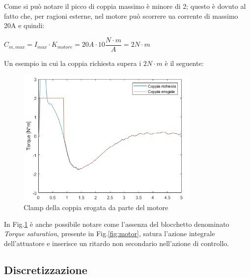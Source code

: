 Come si può notare il picco di coppia massimo è minore di 2; questo è dovuto al fatto che, per ragioni esterne, nel motore può scorrere ua corrente di massimo 20A e quindi:
\begin{center}
	$C_{m,max} = I_{max}\cdot{K_{motore}} = 20 A\cdot{10 \dfrac{N\cdot{m}}{A}}=2N\cdot{m}$
\end{center}

Un esempio in cui la coppia richiesta supera i $2N\cdot{m}$ è il seguente:
\begin{figure}[H]
	\centering   	
	\includegraphics[width=0.8\textwidth]{Immagini/saturazione.png}
	\caption{Clamp della coppia erogata da parte del motore}
	\label{fig:clamp_motore}
\end{figure}
In Fig.\ref{fig:clamp_motore} è anche possibile notare come l'assenza del blocchetto denominato \textit{Torque saturation}, presente in Fig.\ref{fig:motor}, satura l'azione integrale dell'attuatore e inserisce un ritardo non secondario nell'azione di controllo.
\subsection{Discretizzazione}




